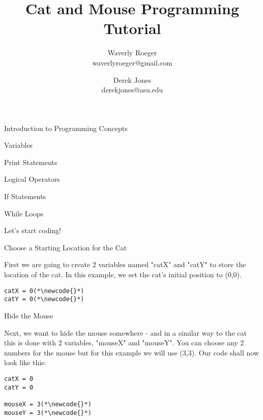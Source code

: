 \documentclass[12pt,oneside]{article}
\newcommand{\subsectitle}[1]{
  \begin{flushleft}{\large#1}\end{flushleft}
}
\newcommand{\sectitle}[1]{
  \begin{flushleft}{\huge#1}\end{flushleft}
}
\newcommand{\newcode}[0]{\hfill<--}
\begin{document}
\title{Cat and Mouse Programming Tutorial}
\author{Waverly Roeger\\\normalsize waverlyroeger@gmail.com \and Derek Jones\\\normalsize derekjones@asu.edu}
\date{}

\maketitle

\sectitle{Introduction to Programming Concepts}

\subsectitle{Variables}

\subsectitle{Print Statements}

\subsectitle{Logical Operators}

\subsectitle{If Statements}

\subsectitle{While Loops}

\sectitle{Let's start coding!}

\begin{samepage}
\subsectitle{Choose a Starting Location for the Cat}

First we are going to create 2 variables named "catX" and "catY" to store the location of the cat. In this example, we set the cat's initial position to (0,0).

\begin{lstlisting}
catX = 0(*\newcode{}*)
catY = 0(*\newcode{}*)
\end{lstlisting}
\end{samepage}

\begin{samepage}
\subsectitle{Hide the Mouse}

Next, we want to hide the mouse somewhere - and in a similar way to the cat this is done with 2 variables, "mouseX" and "mouseY". You can choose any 2 numbers for the mouse but for this example we will use (3,3). Our code shall now look like this:

\begin{lstlisting}
catX = 0
catY = 0

mouseX = 3(*\newcode{}*)
mouseY = 3(*\newcode{}*)
\end{lstlisting}
\end{samepage}
\end{document}
